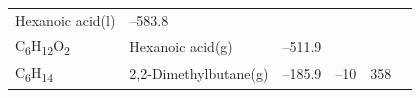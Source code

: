 \documentclass[
]{book}
\theoremstyle{definition}
\theoremstyle{definition}
\theoremstyle{definition}
\theoremstyle{remark}
\begin{document}
\begin{longtable}[]{@{}llllll@{}}
\begin{minipage}[t]{0.17\columnwidth}
Hexanoic acid(l)\strut
\end{minipage} & \begin{minipage}[t]{0.15\columnwidth}\raggedright
--583.8\strut
\end{minipage} & \begin{minipage}[t]{0.15\columnwidth}\raggedright
\strut
\end{minipage} & \begin{minipage}[t]{0.14\columnwidth}\raggedright
\strut
\end{minipage} & \begin{minipage}[t]{0.14\columnwidth}\raggedright
\strut
\end{minipage}\tabularnewline
\begin{minipage}[t]{0.07\columnwidth}\raggedright
C\textsubscript{6}H\textsubscript{12}O\textsubscript{2}\strut
\end{minipage} & \begin{minipage}[t]{0.17\columnwidth}\raggedright
Hexanoic acid(g)\strut
\end{minipage} & \begin{minipage}[t]{0.15\columnwidth}\raggedright
--511.9\strut
\end{minipage} & \begin{minipage}[t]{0.15\columnwidth}\raggedright
\strut
\end{minipage} & \begin{minipage}[t]{0.14\columnwidth}\raggedright
\strut
\end{minipage} & \begin{minipage}[t]{0.14\columnwidth}\raggedright
\strut
\end{minipage}\tabularnewline
\begin{minipage}[t]{0.07\columnwidth}\raggedright
C\textsubscript{6}H\textsubscript{14}\strut
\end{minipage} & \begin{minipage}[t]{0.17\columnwidth}\raggedright
2,2-Dimethylbutane(g)\strut
\end{minipage} & \begin{minipage}[t]{0.15\columnwidth}\raggedright
--185.9\strut
\end{minipage} & \begin{minipage}[t]{0.15\columnwidth}\raggedright
--10\strut
\end{minipage} & \begin{minipage}[t]{0.14\columnwidth}\raggedright
358\strut
\end{minipage} & \begin{minipage}[t]{0.14\columnwidth}\raggedright

\end{minipage}
\end{longtable}
\end{document}
